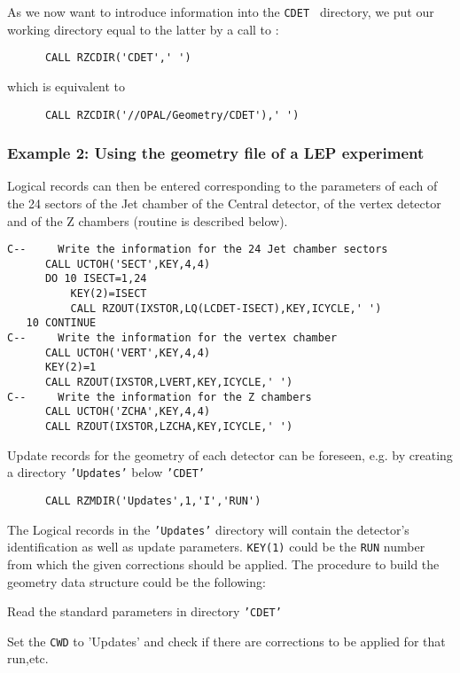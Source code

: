 As we now want to introduce information into the {\tt CDET } directory,
we put our working directory equal to the latter by a call to :

\begin{verbatim}
      CALL RZCDIR('CDET',' ')
\end{verbatim}

which is equivalent to

\begin{verbatim}
      CALL RZCDIR('//OPAL/Geometry/CDET'),' ')
\end{verbatim}

\subsubsection*{Example 2: Using the geometry file of a LEP experiment}

Logical records can then be entered corresponding to the parameters
of each of the 24 sectors of the Jet chamber of the Central detector,
of the vertex detector and of the Z chambers
(routine  is described below).

\begin{verbatim}
C--     Write the information for the 24 Jet chamber sectors
      CALL UCTOH('SECT',KEY,4,4)
      DO 10 ISECT=1,24
          KEY(2)=ISECT
          CALL RZOUT(IXSTOR,LQ(LCDET-ISECT),KEY,ICYCLE,' ')
   10 CONTINUE
C--     Write the information for the vertex chamber
      CALL UCTOH('VERT',KEY,4,4)
      KEY(2)=1
      CALL RZOUT(IXSTOR,LVERT,KEY,ICYCLE,' ')
C--     Write the information for the Z chambers
      CALL UCTOH('ZCHA',KEY,4,4)
      CALL RZOUT(IXSTOR,LZCHA,KEY,ICYCLE,' ')
\end{verbatim}

Update records for the geometry of each detector can be foreseen, e.g.
by creating a directory {\tt'Updates'} below {\tt'CDET'}

\begin{verbatim}
      CALL RZMDIR('Updates',1,'I','RUN')
\end{verbatim}

The Logical records in the {\tt'Updates'} directory will contain the
detector's identification as well as update parameters. {\tt KEY(1)} could be
the {\tt RUN} number from which the given corrections should be applied.
The procedure to build the geometry data structure could be the following:

\begin{UL}
\item Read the standard parameters in directory {\tt'CDET'}
\item Set the {\tt CWD} to 'Updates' and check if there are corrections
to be applied for that run,etc.
\end{UL}

